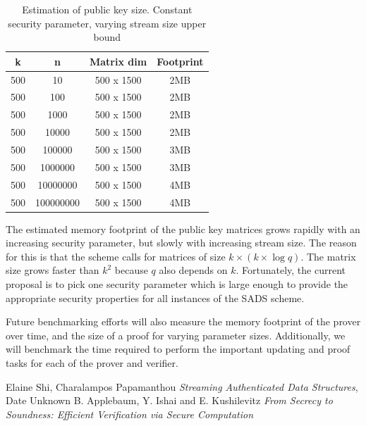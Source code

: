\documentclass[11pt, letterpaper, oneside]{article}
\begin{document}
	
	\begin{table}[h]
	\centering
		\begin{tabular}{ c | c | c | c}
		k & n & Matrix dim & Footprint\\ \hline
		500&10&500 x 1500&2MB\\
		500&100&500 x 1500&2MB\\
		500&1000&500 x 1500&2MB\\
		500&10000&500 x 1500&2MB\\
		500&100000&500 x 1500&3MB\\
		500&1000000&500 x 1500&3MB\\
		500&10000000&500 x 1500&4MB\\
		500&100000000&500 x 1500&4MB\\
		
		\end{tabular}
	\caption{ Estimation of public key size. Constant security parameter, varying stream size upper bound }
	\label{tab:pub-key-n}
	\end{table}
	

	The estimated memory footprint of the public key matrices grows rapidly with an increasing security parameter, but slowly with increasing stream size.
	The reason for this is that the scheme calls for matrices of size $k  \times ( k \times \log q )$.
	The matrix size grows faster than $k^2$ because $q$ also depends on $k$.
	Fortunately, the current proposal is to pick one security parameter which is large enough to provide the appropriate security properties for all instances of the SADS scheme.
	
	Future benchmarking efforts will also measure the memory footprint of the prover over time, and the size of a proof for varying parameter sizes. Additionally, we will benchmark the time required to perform the important updating and proof tasks for each of the prover and verifier. 
	
	



\begin{thebibliography}{9}
	 Elaine Shi, Charalampos Papamanthou \emph{Streaming Authenticated Data Structures}, Date Unknown
	 B. Applebaum, Y. Ishai and E. Kushilevitz \emph{From Secrecy to Soundness: Efficient Verification via Secure Computation}
	\end{thebibliography}
\end{document}
